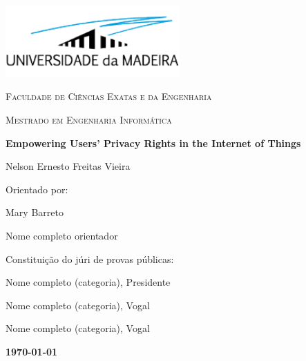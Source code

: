 %
%
\begin{titlepage}
    \centering
    \addtolength{\hoffset}{0.5cm}
        \centering
        \includegraphics[width=0.50\textwidth]{assets/images/uma_logo.png}\par\vspace{0.5cm}
        {\scshape\LARGE {} Faculdade de Ciências Exatas e da Engenharia \par}
        \vspace{1cm}
        {\scshape\Large Mestrado em Engenharia Informática \par}
        \vspace{1.5cm}
        {\huge\bfseries Empowering Users' Privacy Rights in the Internet of Things \par}
        \vspace{2cm}
        {\Large Nelson Ernesto Freitas Vieira\par}
        \vfill
        {\large Orientado por: \par}
            Mary Barreto \par
            Nome completo orientador \par
        \vfill
        {\large Constituição do júri de provas públicas: \par}
            Nome completo (categoria), Presidente \par
            Nome completo (categoria), Vogal \par
            Nome completo (categoria), Vogal \par
        \vfill
        {\large \bfseries \today \par}
    \end{titlepage}
